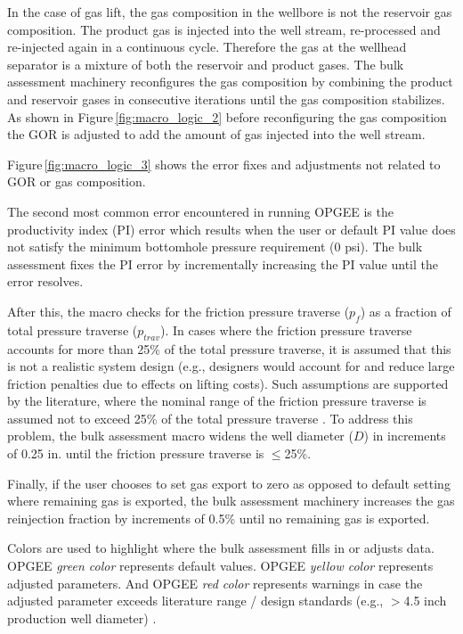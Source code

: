 \documentclass[11pt]{report}
\begin{document}
In the case of gas lift, the gas composition in the wellbore is not the reservoir gas composition. The product gas is injected into the well stream, re-processed and re-injected again in a continuous cycle. Therefore the gas at the wellhead separator is a mixture of both the reservoir and product gases. The bulk assessment machinery reconfigures the gas composition by combining the product and reservoir gases in consecutive iterations until the gas composition stabilizes. As shown in Figure\,\ref{fig:macro_logic_2} before reconfiguring the gas composition the GOR is adjusted to add the amount of gas injected into the well stream.\par

Figure\,\ref{fig:macro_logic_3} shows the error fixes and adjustments not related to GOR or gas composition. 

The second most common error encountered in running OPGEE is the productivity index (PI) error which results when the user or default PI value does not satisfy the minimum bottomhole pressure requirement (0 psi). The bulk assessment fixes the PI error by incrementally increasing the PI value until the error resolves. 

After this, the macro checks for the friction pressure traverse ($p_f$) as a fraction of total pressure traverse ($p_{trav}$). In cases where the friction pressure traverse accounts for more than 25\% of the total pressure traverse, it is assumed that this is not a realistic system design (e.g., designers would account for and reduce large friction penalties due to effects on lifting costs). Such assumptions are supported by the literature, where the nominal range of the friction pressure traverse is assumed not to exceed 25\% of the total pressure traverse \cite{Takacs2005}. To address this problem, the bulk assessment macro widens the well diameter ($D$) in increments of 0.25 in. until the friction pressure traverse is $\leq$25\%. 

Finally, if the user chooses to set gas export to zero as opposed to default setting where remaining gas is exported, the bulk assessment machinery increases the gas reinjection fraction by increments of 0.5\% until no remaining gas is exported. 

Colors are used to highlight where the bulk assessment fills in or adjusts data. OPGEE \textit{green color} represents default values. OPGEE \textit{yellow color} represents adjusted parameters. And OPGEE \textit{red color} represents warnings in case the adjusted parameter exceeds literature range / design standards (e.g., $>$4.5 inch production well diameter) \cite[p. 106]{Clegg2007}.
\end{document}
